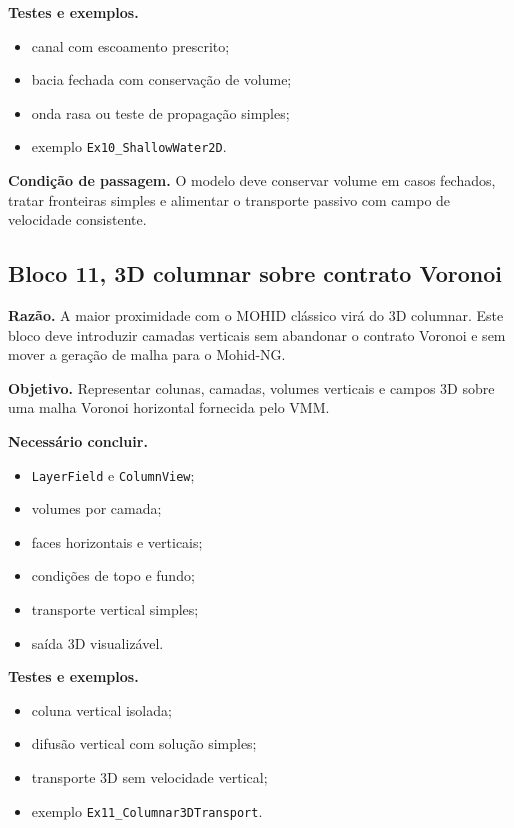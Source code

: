 \documentclass[11pt,a4paper]{article}
\begin{document}
\textbf{Testes e exemplos.}
\begin{itemize}
  \item canal com escoamento prescrito;
  \item bacia fechada com conserva\c{c}\~ao de volume;
  \item onda rasa ou teste de propaga\c{c}\~ao simples;
  \item exemplo \texttt{Ex10\_ShallowWater2D}.
\end{itemize}

\textbf{Condi\c{c}\~ao de passagem.} O modelo deve conservar volume em casos fechados, tratar fronteiras simples e alimentar o transporte passivo com campo de velocidade consistente.

\subsection*{Bloco 11, 3D columnar sobre contrato Voronoi}

\textbf{Raz\~ao.} A maior proximidade com o MOHID cl\'assico vir\'a do 3D columnar. Este bloco deve introduzir camadas verticais sem abandonar o contrato Voronoi e sem mover a gera\c{c}\~ao de malha para o Mohid-NG.

\textbf{Objetivo.} Representar colunas, camadas, volumes verticais e campos 3D sobre uma malha Voronoi horizontal fornecida pelo VMM.

\textbf{Necess\'ario concluir.}
\begin{itemize}
  \item \texttt{LayerField} e \texttt{ColumnView};
  \item volumes por camada;
  \item faces horizontais e verticais;
  \item condi\c{c}\~oes de topo e fundo;
  \item transporte vertical simples;
  \item sa\'ida 3D visualiz\'avel.
\end{itemize}

\textbf{Testes e exemplos.}
\begin{itemize}
  \item coluna vertical isolada;
  \item difus\~ao vertical com solu\c{c}\~ao simples;
  \item transporte 3D sem velocidade vertical;
  \item exemplo \texttt{Ex11\_Columnar3DTransport}.
\end{itemize}
\end{document}
